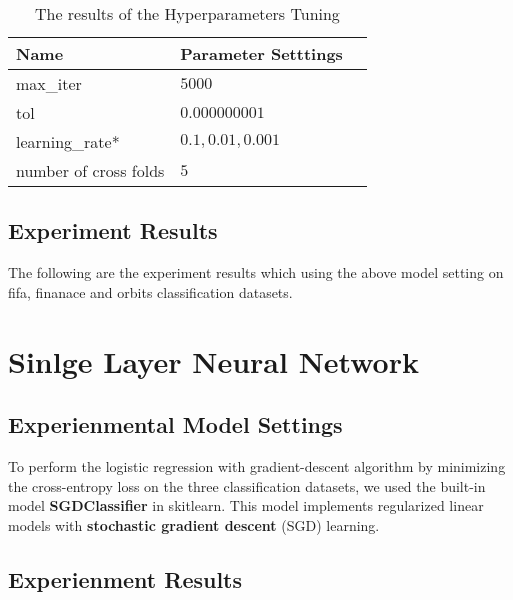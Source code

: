 \documentclass{article}
\begin{document}
\begin{table}[htb]
	\caption{The results of the Hyperparameters Tuning}
	\label{sample-table}
	\centering
	\begin{tabular}{lll}
		\toprule
		\cmidrule{1-2}
		Name     &  Parameter Setttings	\\
		\midrule
		max\_iter 		  & 	$5000$  \\
		tol      	          & 	  $0.000000001$        \\
		learning\_rate* 		  & 	$0.1, 0.01,  0.001$    \\
		number of cross folds		  &   $5$     \\
		\bottomrule
	\end{tabular}
\end{table}



\subsection{Experiment Results}

The following are the experiment results which using the above model setting on fifa, finanace and orbits classification datasets.



\section{Sinlge Layer Neural Network}

\subsection{Experienmental Model Settings}

To perform the logistic regression with gradient-descent algorithm by minimizing the cross-entropy loss on the three classification datasets,  we used the built-in model \textbf{SGDClassifier} in skitlearn. This model implements regularized linear models with \textbf{stochastic gradient descent} (SGD) learning. 

\subsection{Experienment Results}
\end{document}
